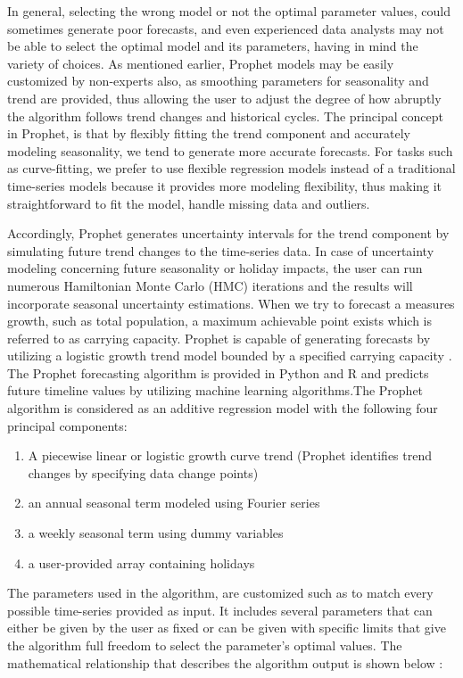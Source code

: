 In general, selecting the wrong model or not the optimal parameter values, could sometimes generate poor forecasts, and even experienced data analysts may not be able to select the optimal model and its parameters, having in mind the variety of choices. As mentioned earlier, Prophet models may be easily customized by non-experts also, as smoothing parameters for seasonality and trend are provided, thus allowing the user to adjust the degree of how abruptly the algorithm follows trend changes and historical cycles. The principal concept in Prophet, is that by flexibly fitting the trend component and accurately modeling seasonality, we tend to generate more accurate forecasts. For tasks such as curve-fitting, we prefer to use flexible regression models instead of a traditional time-series models because it provides more modeling flexibility, thus making it straightforward to fit the model, handle missing data and outliers.
\par Accordingly, Prophet generates uncertainty intervals for the trend component by simulating future trend changes to the time-series data. In case of uncertainty modeling concerning future seasonality or holiday impacts, the user can run numerous Hamiltonian Monte Carlo (HMC) iterations and the results will incorporate seasonal uncertainty estimations. When we try to forecast a measures growth, such as total population, a maximum achievable point exists which is referred to as carrying capacity. Prophet is capable of generating forecasts by utilizing a logistic growth trend model bounded by a specified carrying capacity \cite{tyralis2018large}. The Prophet forecasting algorithm is provided in Python and R and predicts future timeline values by utilizing machine learning algorithms.The Prophet algorithm is considered as an additive regression model with the following four principal components: 
\begin{enumerate}
    \item A piecewise linear or logistic growth curve trend (Prophet identifies trend changes by specifying data change points)
    \item an annual seasonal term modeled using Fourier series
    \item a weekly seasonal term using dummy variables
    \item a user-provided array containing holidays 
\end{enumerate} 
The parameters used in the algorithm, are customized such as to match every possible time-series provided as input. It includes several parameters that can either be given by the user as fixed or can be given with specific limits that give the algorithm full freedom to select the parameter's optimal values. The mathematical relationship that describes the algorithm output is shown below \cite{taylor2018forecasting}:
